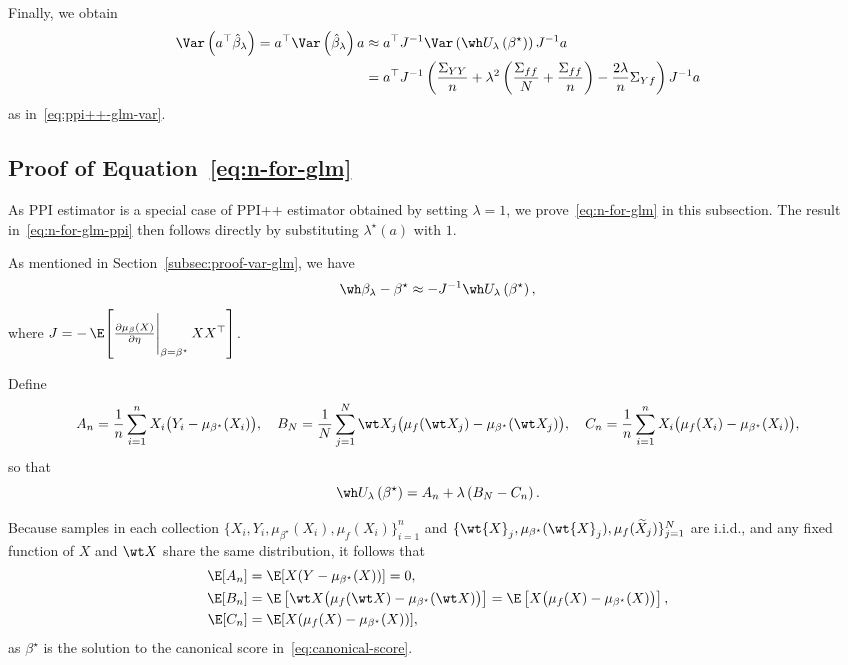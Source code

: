 \noindent
Finally, we obtain
\begin{align*}
\Var\left(a^\top\hat{\beta}_\lambda\right)
=a^\top\Var\left(\hat{\beta}_\lambda\right)a
&\approx a^\top J^{-1}\Var\left(\wh U_\lambda\left(\beta^\star\right)\right)J^{-1} a\\
&=a^\top J^{-1}\left(\frac{\Sigma_{YY}}{n}+\lambda^2\left(\frac{\Sigma_{ff}}{N}+\frac{\Sigma_{ff}}{n}\right)-\frac{2\lambda}{n}\Sigma_{Yf}\right)J^{-1} a
\end{align*}as in~\eqref{eq:ppi++-glm-var}.

\subsection{Proof of Equation~\eqref{eq:n-for-glm}}
\label{subsec:GLM-n}
As PPI estimator is a special case of PPI++ estimator obtained by setting $\lambda = 1$, we prove~\eqref{eq:n-for-glm} in this subsection. The result in~\eqref{eq:n-for-glm-ppi} then follows directly by substituting $\lambda^\star(a)$ with $1$.


\noindent
As mentioned in Section~\ref{subsec:proof-var-glm}, we have\[
    \wh\beta_\lambda-\beta^\star
    \approx-J^{-1}\wh U_\lambda\left(\beta^\star\right),
\]where $J=-\,\E\!\left[
\frac{\partial \mu_{\beta}(X)}{\partial \eta}\Bigg\vert_{\beta=\beta^\star}
\,XX^\top
\right]$.

\noindent
Define\[
A_n=\frac{1}{n}\sum_{i=1}^n X_i\big(Y_i-\mu_{\beta^\star}(X_i)\big),
\quad B_N=\frac{1}{N}\sum_{j=1}^N \wt X_j\big(\mu_f(\wt X_j)-\mu_{\beta^\star}(\wt X_j)\big), 
\quad C_n=\frac{1}{n}\sum_{i=1}^n X_i\big(\mu_f(X_i)-\mu_{\beta^\star}(X_i)\big),
\] so that\[
\wh U_\lambda\left(\beta^\star\right)
    =A_n+\lambda\left(B_N-C_n\right).
\]

\noindent
Because samples in each collection
$\{X_i, Y_i, \mu_{\beta^\star}(X_i), \mu_f(X_i)\}_{i=1}^n$
and 
$\{\wt{X}_j, \mu_{\beta^\star}(\wt{X}_j), \mu_f(\widetilde{X}_j)\}_{j=1}^N$
are i.i.d., and any fixed function of $X$ and $\wt X$ share the same distribution, it follows that
\begin{align*}
\E[A_n]&=\E[X(Y-\mu_{\beta^\star}(X))]=0, \\
\E[B_n]&=\E\left[\wt X\big(\mu_f(\wt X)-\mu_{\beta^\star}(\wt X)\big)\right]=\E\left[ X\big(\mu_f( X)-\mu_{\beta^\star}( X)\big)\right],\\
\E[C_n]&=\E[X(\mu_f(X)-\mu_{\beta^\star}(X))],
\end{align*}as $\beta^\star$ is the solution to the canonical score in~\eqref{eq:canonical-score}.

